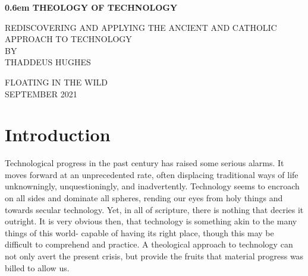 \documentclass[letterpaper]{article}
\begin{document}
\clearpage
\newcommand\nbvspace[1][3]{\vspace*{\stretch{#1}}}
\newcommand\nbstretchyspace{\spaceskip0.5em plus 0.25em minus 0.25em}
\newcommand{\nbtitlestretch}{\spaceskip0.6em}
\pagestyle{plain}
\begin{center}
  \bfseries
  \nbvspace[1]
  \Huge
  {\nbtitlestretch\huge
    THEOLOGY OF TECHNOLOGY}

  \nbvspace[1]
  \normalsize
  REDISCOVERING AND APPLYING THE ANCIENT AND CATHOLIC APPROACH TO TECHNOLOGY\\

  \nbvspace[1]
  \small BY\\
  \Large THADDEUS HUGHES\\

  \nbvspace[2]

  \nbvspace[3]
  \normalsize

  \large
  FLOATING IN THE WILD \\
  \small SEPTEMBER 2021 \\
\end{center}

\raggedbottom
\tableofcontents

\newpage


\section{Introduction}

Technological progress in the past century has raised some serious alarms. It moves forward at an unprecedented rate, often displacing traditional ways of life unknowningly, unquestioningly, and inadvertently. Technology seems to encroach on all sides and dominate all spheres, rending our eyes from holy things and towards secular technology. Yet, in all of scripture, there is nothing that decries it outright. It is very obvious then, that technology is something akin to the many things of this world- capable of having its right place, though this may be difficult to comprehend and practice. A theological approach to technology can not only avert the present crisis, but provide the fruits that material progress was billed to allow us.
\end{document}

